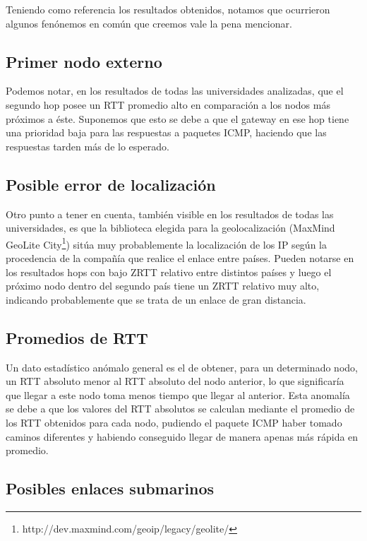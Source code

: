 \documentclass[a4paper, 10pt, twoside]{article}
\begin{document}
Teniendo como referencia los resultados obtenidos, notamos que ocurrieron algunos fenónemos en común que creemos vale la pena mencionar.


\subsection{Primer nodo externo}

Podemos notar, en los resultados de todas las universidades analizadas, que el segundo hop posee un RTT promedio alto en comparación a los nodos más próximos a éste. Suponemos que esto se debe a que el gateway en ese hop tiene una prioridad baja para las respuestas a paquetes ICMP, haciendo que las respuestas tarden más de lo esperado.


\subsection{Posible error de localización}

Otro punto a tener en cuenta, también visible en los resultados de todas las universidades, es que la biblioteca elegida para la geolocalización (MaxMind GeoLite City\footnote{http://dev.maxmind.com/geoip/legacy/geolite/}) sitúa muy probablemente la localización de los IP según la procedencia de la compañía que realice el enlace entre países. Pueden notarse en los resultados hops con bajo ZRTT relativo entre distintos países y luego el próximo nodo dentro del segundo país tiene un ZRTT relativo muy alto, indicando probablemente que se trata de un enlace de gran distancia.


\subsection{Promedios de RTT}

Un dato estadístico anómalo general es el de obtener, para un determinado nodo, un RTT absoluto menor al RTT absoluto del nodo anterior, lo que significaría que llegar a este nodo toma menos tiempo que llegar al anterior. Esta anomalía se debe a que los valores del RTT absolutos se calculan mediante el promedio de los RTT obtenidos para cada nodo, pudiendo el paquete ICMP haber tomado caminos diferentes y habiendo conseguido llegar de manera apenas más rápida en promedio.


\subsection{Posibles enlaces submarinos}
\end{document}
